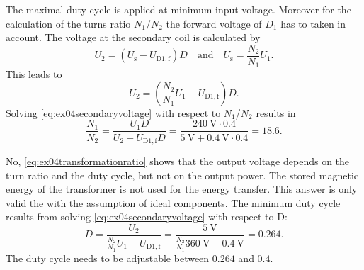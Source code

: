 \begin{solutionblock}
    The maximal duty cycle is applied at minimum input voltage. Moreover for the calculation of the 
    turns ratio $N_\mathrm{1}$/$N_\mathrm{2}$ the forward voltage of $D_\mathrm{1}$ has to taken in account.
    The voltage at the secondary coil is calculated by
    \begin{equation}
        U_\mathrm{2}=\left(U_\mathrm{s}-U_\mathrm{D1,f}\right) D \quad  \mbox{and} \quad 
        U_\mathrm{s}=\frac{N_\mathrm{2}}{N_\mathrm{1}}U_\mathrm{1}.
        \label{eq:ex04transformationratio}        
    \end{equation}
    This leads to
    \begin{equation}
        U_\mathrm{2}=\left(\frac{N_\mathrm{2}}{N_\mathrm{1}}U_\mathrm{1}-U_\mathrm{D1,f}\right) D.
        \label{eq:ex04secondaryvoltage}  
    \end{equation}
    Solving \eqref{eq:ex04secondaryvoltage} with respect to $N_\mathrm{1}$/$N_\mathrm{2}$ results in
    \begin{equation}
        \frac{N_\mathrm{1}}{N_\mathrm{2}}=\frac{U_\mathrm{1}D}{U_\mathrm{2}+ U_\mathrm{D1,f}D}
        =\frac{\SI{240}{\volt}\cdot 0.4}{\SI{5}{\volt}+\SI{0.4}{\volt} \cdot 0.4 }=18.6.
    \end{equation}
\end{solutionblock}



\begin{solutionblock}
    No, \eqref{eq:ex04transformationratio} shows that the output voltage depends on the turn ratio and the duty cycle,
    but not on the output power. The stored magnetic energy of the transformer is not used for the energy transfer.
    This answer is only valid the with the assumption of ideal components. 
    The minimum duty cycle results from solving \eqref{eq:ex04secondaryvoltage} with respect to D:
    \begin{equation}
        D=\frac{U_\mathrm{2}}{\frac{N_\mathrm{2}}{N_\mathrm{1}}U_\mathrm{1}-U_\mathrm{D1,f}}=
        \frac{\SI{5}{\volt}}{\frac{N_\mathrm{2}}{N_\mathrm{1}}\SI{360}{\volt}-\SI{0.4}{\volt}}=0.264.
    \end{equation}
    The duty cycle needs to be adjustable between $0.264$ and $0.4$.
\end{solutionblock}
         
